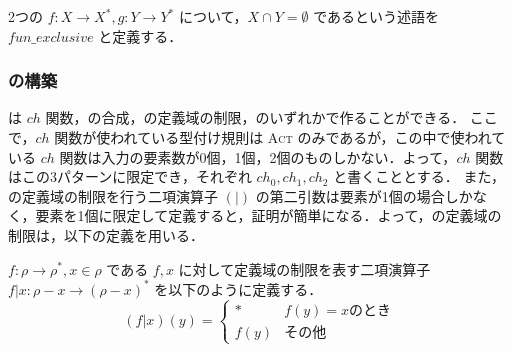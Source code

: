 \begin{dfn}
  2つの \tmp $f : X \rightarrow X^*, g : Y \rightarrow Y^*$ について，$X \cap Y = \emptyset$ であるという述語を $fun\_exclusive$ と定義する．
\end{dfn}




\subsubsection{\tmp の構築}

\tmp は $ch$ 関数，\tmp の合成，\tmp の定義域の制限，のいずれかで作ることができる．
ここで，$ch$ 関数が使われている型付け規則は \textsc{Act} のみであるが，この中で使われている $ch$ 関数は入力の要素数が0個，1個，2個のものしかない．よって，$ch$ 関数はこの3パターンに限定でき，それぞれ $ch_0, ch_1, ch_2$ と書くこととする．
また，\tmp の定義域の制限を行う二項演算子 $(|)$ の第二引数は要素が1個の場合しかなく，要素を1個に限定して定義すると，証明が簡単になる．よって，\tmp の定義域の制限は，以下の定義を用いる．

\begin{adjustvboxheight}
\begin{dfn}
  $f : \rho \rightarrow \rho^*, x \in \rho$ である $f, x$ に対して定義域の制限を表す二項演算子 $f | x : \rho - x \rightarrow (\rho - x)^*$ を以下のように定義する． \\
  \[ (f | x)(y) = \begin{cases}
    \ast & f(y) = x \mbox{のとき} \\
    f(y) & \mbox{その他}
  \end{cases} \]
  \vspace{1pt}
\end{dfn}
\end{adjustvboxheight}

